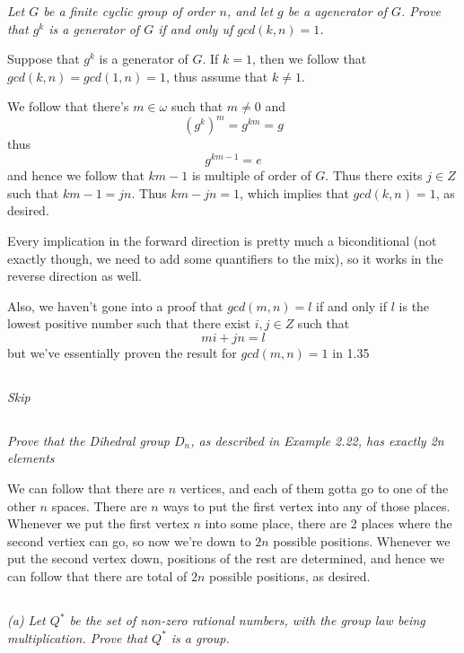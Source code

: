 \documentclass[11pt,oneside,titlepage]{book}
\begin{document}
\textit{Let $G$ be a finite cyclic group of order $n$, and let $g$ be
a agenerator of $G$.  Prove that $g^k$ is a generator of $G$ if and
only uf $gcd(k, n) = 1$.}

Suppose that $g^k$ is a generator of $G$. If $k = 1$,
then we follow that $gcd(k, n) = gcd(1, n) = 1$, thus
assume that $k \neq 1$. 

We follow that there's $m \in \omega$ such that $m \neq 0$
and
$$(g^k)^m = g^{km} = g$$
thus
$$g^{km - 1}  = e$$
and hence we follow that $km - 1$ is multiple of order of $G$.  Thus
there exits $j \in Z$ such that $km - 1 = jn$.  Thus $km - jn = 1$,
which implies that $gcd(k, n) = 1$, as desired.

Every implication in the forward direction is pretty much a
biconditional (not exactly though, we need to add some quantifiers to
the mix), so it works in the reverse direction as well.

Also, we haven't gone into a proof that $gcd(m, n) = l$ if and only if
$l$ is the lowest positive number such that there exist $i, j \in Z$
such that
$$mi + jn = l$$
but we've essentially proven the result for $gcd(m, n) = 1$ in 1.35

\subsection{}

\textit{Skip}

\subsection{}

\textit{Prove that the Dihedral group $D_n$, as described in Example
  2.22, has exactly 2n elements}

We can follow that there are $n$ vertices, and each of them gotta go
to one of the other $n$ spaces. There are $n$ ways to put the first vertex
into any of those places. Whenever we put the first vertex $n$ into some place,
there are 2 places where the second vertiex can go, so now we're down to $2n$
possible positions. Whenever we put the second vertex down, positions of the
rest are determined, and hence we can follow that there are total of $2n$
possible positions, as desired.

\subsection{}

\textit{(a) Let $Q^*$ be the set of non-zero rational numbers, with
  the group law being multiplication. Prove that $Q^*$ is a group.}
\end{document}

